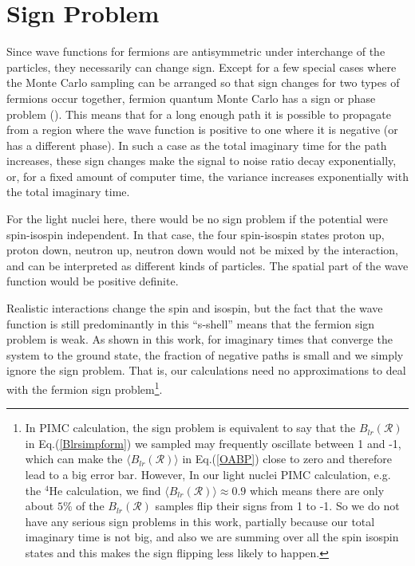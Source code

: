 \documentclass[12pt,letterpaper,UTF8]{report}
\begin{document}
\section{Sign Problem}
\label{secSignProblem}

Since wave functions for fermions are antisymmetric under interchange of
the particles, they necessarily can change sign. Except for a few special
cases where the Monte Carlo sampling can be arranged so
that sign changes for two types of fermions occur together, fermion quantum
Monte Carlo has a sign or phase problem (\cite{Umrigar2007PRL,Alhassid1994PRL,LiZiXiang2019a}).
This means that for a long
enough path it is possible to propagate from a region where the wave function
is positive to one where it is negative (or has a different phase).
In such a case as the total imaginary time for the path increases,
these sign changes make the signal to noise ratio decay exponentially,
or, for a fixed amount of computer time, the variance increases exponentially
with the total imaginary time.

For the light nuclei here, there would be no sign problem if the potential
were spin-isospin independent. In that case, the four spin-isospin
states proton up, proton down, neutron up, neutron down would not be
mixed by the interaction, and can be interpreted as different kinds of
particles. The spatial part of the wave function would be positive definite.

Realistic interactions change the spin and isospin, but the fact that
the wave function is still predominantly in this ``s-shell'' means that
the fermion sign problem is weak. As shown in this work, for imaginary
times that converge the system to the ground state, the fraction of
negative paths is small and we simply ignore the sign problem. That is,
our calculations need no approximations to deal with the fermion sign problem\footnote{
In PIMC calculation, the sign problem is equivalent to say that the $B_{lr} (\mathcal{R})$ in Eq.(\ref{Blrsimpform}) we sampled may frequently oscillate between 1 and -1, which can make the $\langle B_{lr} (\mathcal{R}) \rangle$ in Eq.(\ref{OABP}) close to zero and therefore lead to a big error bar.
However, In our light nuclei PIMC calculation, e.g. the $^4$He calculation, we find $\langle B_{lr} (\mathcal{R}) \rangle \approx 0.9$ which means there are only about $5\%$ of the $B_{lr} (\mathcal{R})$ samples flip their signs from 1 to -1. So we do not have any serious sign problems in this work, partially because our total imaginary time is not big, and also we are summing over all the spin isospin states and this makes the sign flipping less likely to happen.}.
\end{document}

